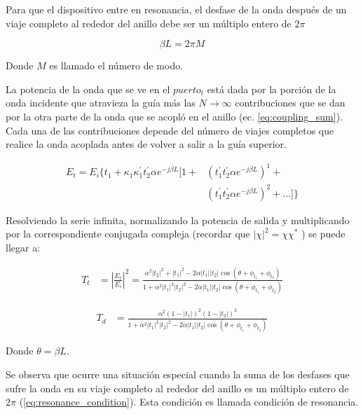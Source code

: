 \documentclass{IEEEtran}
\begin{document}
Para que el dispositivo entre en resonancia, el desfase de la onda después de un viaje
completo al rededor del anillo debe ser un múltiplo entero de $2 \pi$

\begin{equation}
\beta L = 2 \pi M
\label{eq:resonant_condition}
\end{equation} 
 
Donde $M$ es llamado el número de modo. 

La potencia de la onda que se ve en el $puerto_t$ está dada por la porción de la onda incidente
que atravieza la guía más las $N\to\infty$ contribuciones que se dan por la otra parte de la
onda que se acopló en el anillo (ec. \ref{eq:coupling_sum}). 
Cada una de las contribuciones depende del número de viajes completos que realice la onda
acoplada antes de volver a salir a la guía superior.

\begin{align}
E_t = E_i\{
t_1+
\kappa_1\kappa_1^{'} t_2^{'} \alpha e^{-j \beta L} [ 
1 +
&(t_1^{'} t_2^{'} \alpha e^{-j \beta L})^1 + \nonumber \\
&(t_1^{'} t_2^{'} \alpha e^{-j \beta L})^2 +
...]\}
\label{eq:coupling_sum}
\end{align}

Resolviendo la serie infinita, normalizando la potencia de salida
 y multiplicando por la correspondiente conjugada 
compleja (recordar que $|\chi|^2 = \chi \chi^*$  \cite{paloczi2005polymer}) se puede llegar a:

\begin{align}
 T_t &= |\frac{E_t}{E_i}|^2 = 
    \frac{\alpha^2 |t_2|^2 + |t_1|^2 - 2\alpha |t_1||t_2| 
	\cos(\theta + \phi_{t_1} + \phi_{t_2}) }
    {1 + \alpha^2|t_1|^2 |t_2|^2 - 2\alpha |t_1||t_2|
	\cos(\theta + \phi_{t_1} + \phi_{t_2}) }
\label{eq:T_t}
\end{align} 


\begin{align}
 T_d &= 
    \frac{\alpha^2 (1-|t_1|)^2 (1-|t_2|)^2}
    {1 + \alpha^2|t_1|^2 |t_2|^2 - 2\alpha |t_1||t_2|
	\cos(\theta + \phi_{t_1} + \phi_{t_2}) }
\label{eq:T_d}
\end{align} 

Donde $\theta = \beta L$. 

Se observa que ocurre una situación especial cuando la suma de los desfases que
sufre la onda en su viaje completo al rededor del anillo es un múltiplo entero
de $2\pi$ (\ref{eq:resonance_condition}). 
Esta condición es llamada condición de resonancia.
\end{document}
